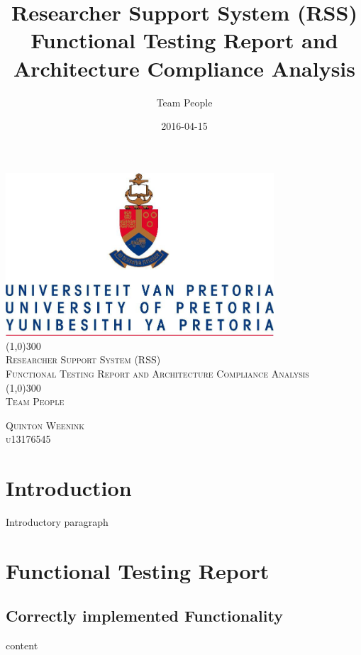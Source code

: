 \documentclass{article}
\title{
Researcher Support System (RSS)\\
Functional Testing Report and Architecture Compliance Analysis
}
\date{2016-04-15}
\author{Team People}
\begin{document}
\begin{titlepage}
	\begin{center}
		\includegraphics[width=10cm]{UP.jpg}  \\
		[1cm]
		\line(1,0){300} \\
		[0.3cm]
		\textsc{\Large
			Researcher Support System (RSS)\\
			Functional Testing Report and Architecture Compliance Analysis
		}\\
		[0.1cm]
		\line(1,0){300} \\
		[0.4cm]
		\textsc{\Large
			Team People
		} \\

	\end{center}
	\begin{flushright}
	\textsc{\Large
	Quinton Weenink\\ 
	u13176545\\
	}
	\end{flushright}
\end{titlepage}

\tableofcontents
\thispagestyle{empty}
\cleardoublepage

\setcounter{page}{1}
\section{Introduction}

Introductory paragraph

\newpage

\section{Functional Testing Report}

	\subsection{Correctly implemented Functionality}
	content
\end{document}
